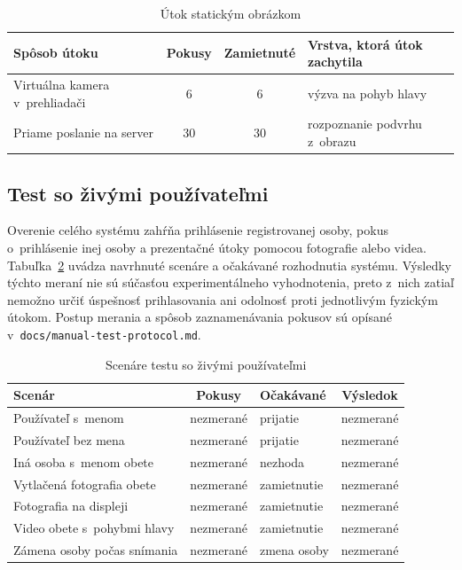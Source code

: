 \documentclass[12pt,a4paper,oneside]{report}
\begin{document}
\begin{table}[H]
  \centering
  \caption{Útok statickým obrázkom}
  \label{tab:static}
  \begin{tabularx}{\textwidth}{@{}X c c l@{}}
    \toprule
    Spôsob útoku & Pokusy & Zamietnuté & Vrstva, ktorá útok zachytila \\
    \midrule
    Virtuálna kamera v~prehliadači & 6 & 6 & výzva na pohyb hlavy \\
    Priame poslanie na server & 30 & 30 & rozpoznanie podvrhu z~obrazu \\
    \bottomrule
  \end{tabularx}
\end{table}

\subsection*{Test so živými používateľmi}
Overenie celého systému zahŕňa prihlásenie registrovanej osoby, pokus o~prihlásenie
inej osoby a prezentačné útoky pomocou fotografie alebo videa. Tabuľka~\ref{tab:e2e}
uvádza navrhnuté scenáre a očakávané rozhodnutia systému. Výsledky týchto meraní
nie sú súčasťou experimentálneho vyhodnotenia, preto z~nich zatiaľ nemožno určiť
úspešnosť prihlasovania ani odolnosť proti jednotlivým fyzickým útokom.
Postup merania a spôsob zaznamenávania pokusov sú opísané
v~\texttt{docs/manual-test-protocol.md}.

\begin{table}[H]
  \centering
  \caption{Scenáre testu so živými používateľmi}
  \label{tab:e2e}
  \small
  \begin{tabularx}{\textwidth}{@{}X c l c@{}}
    \toprule
    Scenár & Pokusy & Očakávané & Výsledok \\
    \midrule
    Používateľ s~menom & nezmerané & prijatie & nezmerané \\
    Používateľ bez mena & nezmerané & prijatie & nezmerané \\
    Iná osoba s~menom obete & nezmerané & nezhoda & nezmerané \\
    Vytlačená fotografia obete & nezmerané & zamietnutie & nezmerané \\
    Fotografia na displeji & nezmerané & zamietnutie & nezmerané \\
    Video obete s~pohybmi hlavy & nezmerané & zamietnutie & nezmerané \\
    Zámena osoby počas snímania & nezmerané & zmena osoby & nezmerané \\
    \bottomrule
  \end{tabularx}
\end{table}
\end{document}
